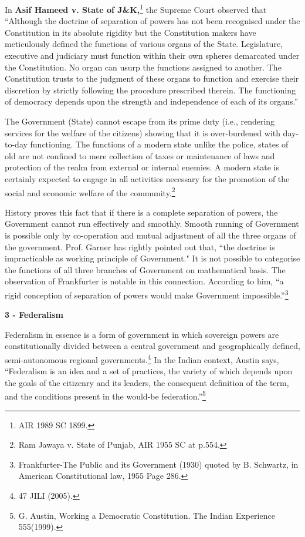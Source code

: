 \begin{multicols}{2}
\noi
In \textbf{Asif Hameed v. State of J\&K,}\footnote{AIR 1989 SC 1899.} the Supreme Court observed that “Although the doctrine of
separation of powers has not been recognised under the Constitution in its absolute rigidity but
the Constitution makers have meticulously defined the functions of various organs of the State.
Legislature, executive and judiciary must function within their own spheres demarcated under the
Constitution. No organ can usurp the functions assigned to another. The Constitution trusts to the
judgment of these organs to function and exercise their discretion by strictly following the
procedure prescribed therein. The functioning of democracy depends upon the strength and
independence of each of its organs.”

\noi
The Government (State) cannot escape from its prime duty (i.e., rendering services for the welfare
of the citizens) showing that it is over-burdened with day-to-day functioning. The functions of a
modern state unlike the police, states of old are not confined to mere collection of taxes or maintenance of laws and protection of the realm from external or internal enemies. A modern
state is certainly expected to engage in all activities necessary for the promotion of the social and
economic welfare of the community.\footnote{Ram Jawaya v. State of Punjab, AIR 1955 SC at p.554.}

\noi
History proves this fact that if there is a complete separation of powers, the Government cannot
run effectively and smoothly. Smooth running of Government is possible only by co-operation
and mutual adjustment of all the three organs of the government. Prof. Garner has rightly pointed
out that, “the doctrine is impracticable as working principle of Government." It is not possible to
categorise the functions of all three branches of Government on mathematical basis. The
observation of Frankfurter is notable in this connection. According to him, “a rigid conception of
separation of powers would make Government impossible.”\footnote{Frankfurter-The Public and its Government (1930) quoted by B. Schwartz, in American Constitutional law, 1955 Page 286.}

\noi
{\large \bfseries 3 - Federalism}

\vspace{-.15cm}

\noi
Federalism in essence is a form of government in which sovereign powers are constitutionally
divided between a central government and geographically defined, semi-autonomous regional
governments.\footnote{47 JILI (2005).} In the Indian context, Austin says, “Federalism is an idea and a set of practices, the variety of which depends upon the goals of the citizenry and its leaders, the consequent definition of the term, and the conditions present in the would-be federation.”\footnote{G. Austin, Working a Democratic Constitution. The Indian Experience 555(1999).}


\end{multicols}
